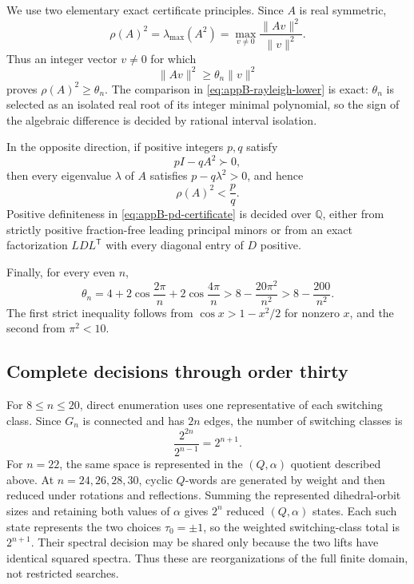 We use two elementary exact certificate principles.  Since \(A\) is real
symmetric,
\begin{equation}\label{eq:appB-rayleigh}
 \rho(A)^2=\lambda_{\max}(A^2)
 =\max_{v\ne0}\frac{\lVert Av\rVert^2}{\lVert v\rVert^2}.
\end{equation}
Thus an integer vector \(v\ne0\) for which
\begin{equation}\label{eq:appB-rayleigh-lower}
 \lVert Av\rVert^2\geq\theta_n\lVert v\rVert^2
\end{equation}
proves \(\rho(A)^2\geq\theta_n\).  The comparison in
\eqref{eq:appB-rayleigh-lower} is exact: \(\theta_n\) is selected as an
isolated real root of its integer minimal polynomial, so the sign of the
algebraic difference is decided by rational interval isolation.

In the opposite direction, if positive integers \(p,q\) satisfy
\begin{equation}\label{eq:appB-pd-certificate}
 pI-qA^2\succ0,
\end{equation}
then every eigenvalue \(\lambda\) of \(A\) satisfies
\(p-q\lambda^2>0\), and hence
\begin{equation}\label{eq:appB-pd-consequence}
 \rho(A)^2<\frac pq.
\end{equation}
Positive definiteness in \eqref{eq:appB-pd-certificate} is decided over
\(\mathbb Q\), either from strictly positive fraction-free leading principal
minors or from an exact factorization \(LDL^{\mathsf T}\) with every diagonal entry of
\(D\) positive.

Finally, for every even \(n\),
\begin{equation}\label{eq:appB-cosine-bound}
 \theta_n
 =4+2\cos\frac{2\pi}{n}+2\cos\frac{4\pi}{n}
 >8-\frac{20\pi^2}{n^2}
 >8-\frac{200}{n^2}.
\end{equation}
The first strict inequality follows from
\(\cos x>1-x^2/2\) for nonzero \(x\), and the second from \(\pi^2<10\).

\subsection{Complete decisions through order thirty}
\label{app:orders-8-30}

For \(8\leq n\leq20\), direct enumeration uses one representative of each
switching class.  Since \(G_n\) is connected and has \(2n\) edges, the
number of switching classes is
\[
 \frac{2^{2n}}{2^{n-1}}=2^{n+1}.
\]
For \(n=22\), the same space is represented in the \((Q,\alpha)\) quotient
described above.  At \(n=24,26,28,30\), cyclic \(Q\)-words are generated by
weight and then reduced under rotations and reflections.  Summing the
represented dihedral-orbit sizes and retaining both values of \(\alpha\)
gives \(2^n\) reduced \((Q,\alpha)\) states.  Each such state represents the
two choices \(\tau_0=\pm1\), so the weighted switching-class total is
\(2^{n+1}\).  Their spectral decision may be shared only because the two
lifts have identical squared spectra.  Thus these are reorganizations of the
full finite domain, not restricted searches.

